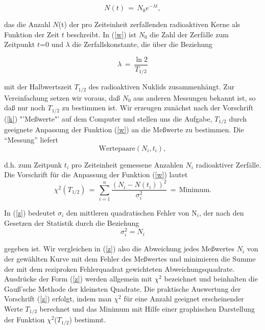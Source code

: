 \begin{equation} \label{w}
N(t)\,=\,N_{0}e^{-\lambda t},
\end{equation}


das die Anzahl $N$(t) der pro Zeiteinheit zerfallenden radioaktiven
Kerne als Funktion der Zeit $t$ beschreibt. In (\ref{w}) ist $N_0$ die
Zahl der Zerfälle zum Zeitpunkt $t$=0 und $\lambda$ die
Zerfallskonstante, die über die Beziehung

\begin{equation} \label{x}
\lambda \,=\,\frac{\ln 2}{T_{1/2}}
\end{equation}

mit der Halbwertszeit $T_{1/2}$ des radioaktiven Nuklids zusammenhängt.
Zur Vereinfachung setzen wir voraus, daß $N_0$ aus anderen Messungen
bekannt ist, so daß nur noch $T_{1/2}$ zu bestimmen ist. Wir erzeugen
zunächst nach der Vorschrift (\ref{k}) "'Meßwerte"' auf dem Computer
und stellen uns die Aufgabe, $T_{1/2}$ durch geeignete Anpassung der
Funktion (\ref{w}) an die Meßwerte zu bestimmen. Die "`Messung"'
liefert\\

\begin{equation} \label{y}
\mbox{Wertepaare} (N_i, t_i),
\end{equation}

d.h. zum Zeitpunk $t_i$ pro Zeiteinheit gemessene Anzahlen $N_i$
radioaktiver Zerfälle. Die Vorschrift für die Anpassung der Funktion
(\ref{w}) lautet\\

\begin{equation} \label{z}
\chi^{2}(T_{1/2})\,=\,\sum_{i=1}^{n}\frac{(N_{i}-N(t_{i}))^{2}}{\sigma_{i}^{2}}\,=\,\mbox{Minimum}.
\end{equation}

In (\ref{z}) bedeutet $\sigma_i$ den mittleren quadratischen Fehler von
N$_i$, der nach den Gesetzen der Statistik durch die Beziehung\\

\begin{equation} \label{aa}
\sigma_i^2 = N_i
\end{equation}

gegeben ist. Wir vergleichen in (\ref{z}) also die Abweichung jedes
Meßwertes $N_i$ von der gewählten Kurve mit dem Fehler des Meßwertes
und minimieren die Summe der mit dem reziproken Fehlerquadrat
gewichteten Abweichungsquadrate. Ausdrücke der Form (\ref{z}) werden
allgemein mit $\chi^2$ bezeichnet und beinhalten die Gauß'sche Methode
der kleinsten Quadrate. Die praktische Auswertung der Vorschrift
(\ref{z}) erfolgt, indem man $\chi^2$ für eine Anzahl geeignet
erscheinender Werte $T_{1/2}$ berechnet und das Minimum mit Hilfe einer
graphischen Darstellung der Funktion $\chi^2$($T_{1/2}$) bestimmt.\\



